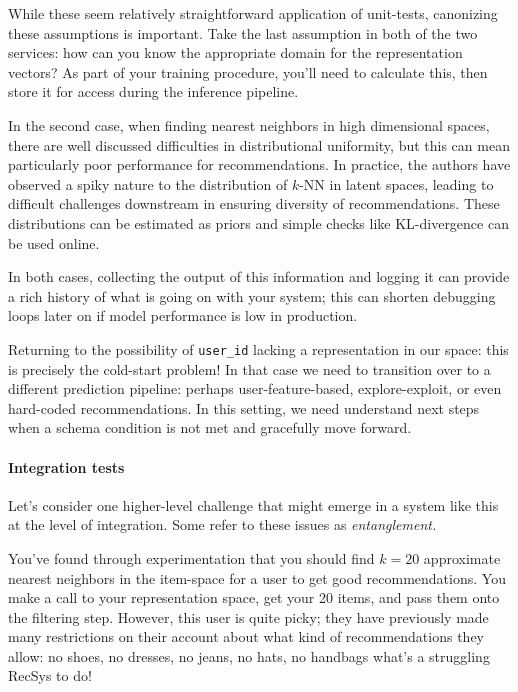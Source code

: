 While these seem relatively straightforward application of unit-tests, canonizing these assumptions is important. Take the last assumption in both of the two services: how can you know the appropriate domain for the representation vectors? As part of your training procedure, you'll need to calculate this, then store it for access during the inference pipeline. 

In the second case, when finding nearest neighbors in high dimensional spaces, there are well discussed difficulties in distributional uniformity, but this can mean particularly poor performance for recommendations. In practice, the authors have observed a spiky nature to the distribution of $k$-NN in latent spaces, leading to difficult challenges downstream in ensuring diversity of recommendations. These distributions can be estimated as priors and simple checks like KL-divergence can be used online. 

In both cases, collecting the output of this information and logging it can provide a rich history of what is going on with your system; this can shorten debugging loops later on if model performance is low in production.

Returning to the possibility of \lstinline{user_id} lacking a representation in our space: this is precisely the cold-start problem! In that case we need to transition over to a different prediction pipeline: perhaps user-feature-based, explore-exploit, or even hard-coded recommendations. In this setting, we need understand next steps when a schema condition is not met and gracefully move forward. 

\paragraph{Integration tests}

Let's consider one higher-level challenge that might emerge in a system like this at the level of integration. Some refer to these issues as \emph{entanglement.}

You've found through experimentation that you should find $k=20$ approximate nearest neighbors in the item-space for a user to get good recommendations. You make a call to your representation space, get your 20 items, and pass them onto the filtering step. However, this user is quite picky; they have previously made many restrictions on their account about what kind of recommendations they allow: no shoes, no dresses, no jeans, no hats, no handbags \textemdash what's a struggling RecSys to do! 

